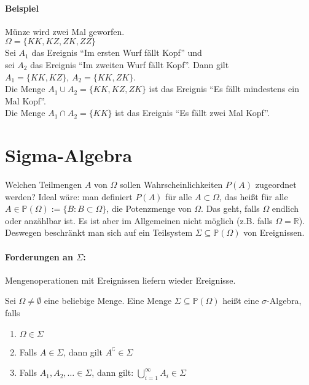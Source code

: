 \paragraph{Beispiel} Münze wird zwei Mal geworfen.\\
$\Omega = \{KK, KZ, ZK, ZZ\}$\\
Sei $A_1$ das Ereignis \enquote{Im ersten Wurf fällt Kopf} und\\
sei $A_2$ das Ereignis \enquote{Im zweiten Wurf fällt Kopf}. Dann gilt\\
$A_1 = \{KK, KZ\}$, $A_2 = \{KK, ZK\}$.\\
Die Menge $A_1 \cup A_2 = \{KK, KZ, ZK\}$ ist das Ereignis \enquote{Es fällt mindestens ein Mal
    Kopf}.\\
Die Menge $A_1 \cap A_2 = \{KK\}$ ist das Ereignis \enquote{Es fällt zwei Mal Kopf}.\\


\section{Sigma-Algebra}
Welchen Teilmengen $A$ von $\Omega$ sollen Wahrscheinlichkeiten $P(A)$ zugeordnet werden?
Ideal wäre: man definiert $P(A)$ für alle $A \subset \Omega$, das heißt für alle
$A \in \mathbb{P}(\Omega) := \{B:B\subset\Omega\}$, die Potenzmenge von $\Omega$.
Das geht, falls $\Omega$ endlich oder anzählbar ist.
Es ist aber im Allgemeinen nicht möglich
(z.B. falls $\Omega = \mathbb{R}$).
Deswegen beschränkt man sich auf ein Teilsystem $\Sigma \subseteq \mathbb{P}(\Omega)$ von
Ereignissen.
\paragraph{Forderungen an $\Sigma$:}
Mengenoperationen mit Ereignissen liefern wieder Ereignisse.

\begin{definition}
    Sei $\Omega \neq \emptyset$ eine beliebige Menge.
    Eine Menge $\Sigma \subseteq \mathbb{P}(\Omega)$ heißt eine $\sigma$-Algebra, falls
    \begin{enumerate}
        \item $\Omega \in \Sigma$
        \item Falls $A \in \Sigma$, dann gilt $A^\complement \in \Sigma$
        \item Falls $A_1, A_2, \dots \in \Sigma$, dann gilt:
              $\bigcup\limits_{i=1}^\infty A_i \in \Sigma$
    \end{enumerate}
\end{definition}

